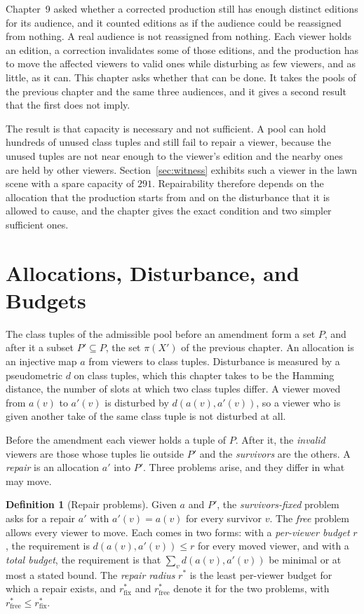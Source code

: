 \documentclass[11pt,twoside,openright]{book}
\theoremstyle{plain}
\theoremstyle{definition}
\newtheorem{definition}[theorem]{Definition}
\theoremstyle{remark}
\begin{document}
Chapter~9 asked whether a corrected production still has enough distinct editions for its audience, and it counted editions as if the audience could be reassigned from nothing. A real audience is not reassigned from nothing. Each viewer holds an edition, a correction invalidates some of those editions, and the production has to move the affected viewers to valid ones while disturbing as few viewers, and as little, as it can. This chapter asks whether that can be done. It takes the pools of the previous chapter and the same three audiences, and it gives a second result that the first does not imply.

The result is that capacity is necessary and not sufficient. A pool can hold hundreds of unused class tuples and still fail to repair a viewer, because the unused tuples are not near enough to the viewer's edition and the nearby ones are held by other viewers. Section~\ref{sec:witness} exhibits such a viewer in the lawn scene with a spare capacity of $291$. Repairability therefore depends on the allocation that the production starts from and on the disturbance that it is allowed to cause, and the chapter gives the exact condition and two simpler sufficient ones.

\section{Allocations, Disturbance, and Budgets}\label{sec:setting}

The class tuples of the admissible pool before an amendment form a set $P$, and after it a subset $P'\subseteq P$, the set $\pi(X')$ of the previous chapter. An allocation is an injective map $a$ from viewers to class tuples. Disturbance is measured by a pseudometric $d$ on class tuples, which this chapter takes to be the Hamming distance, the number of slots at which two class tuples differ. A viewer moved from $a(v)$ to $a'(v)$ is disturbed by $d(a(v),a'(v))$, so a viewer who is given another take of the same class tuple is not disturbed at all.

Before the amendment each viewer holds a tuple of $P$. After it, the \emph{invalid} viewers are those whose tuples lie outside $P'$ and the \emph{survivors} are the others. A \emph{repair} is an allocation $a'$ into $P'$. Three problems arise, and they differ in what may move.

\begin{definition}[Repair problems]\label{def:repair}
Given $a$ and $P'$, the \emph{survivors-fixed} problem asks for a repair $a'$ with $a'(v)=a(v)$ for every survivor $v$. The \emph{free} problem allows every viewer to move. Each comes in two forms: with a \emph{per-viewer budget} $r$, the requirement is $d(a(v),a'(v))\le r$ for every moved viewer, and with a \emph{total budget}, the requirement is that $\sum_vd(a(v),a'(v))$ be minimal or at most a stated bound. The \emph{repair radius} $r^\ast$ is the least per-viewer budget for which a repair exists, and $r^\ast_{\mathrm{fix}}$ and $r^\ast_{\mathrm{free}}$ denote it for the two problems, with $r^\ast_{\mathrm{free}}\le r^\ast_{\mathrm{fix}}$.
\end{definition}
\end{document}
